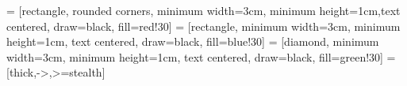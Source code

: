 \usepackage[utf8]{inputenc}
\usepackage[T1]{fontenc}
\usepackage{graphicx}
\usepackage{tikz}
\usepackage{times}
\usepackage{pgfpages}
\usepackage{multicol}
\usepackage{adjustbox}
\usepackage{booktabs}
\usepackage{amssymb}
\usepackage{multirow}
\usepackage{xcolor}
\usepackage{caption}
\usepackage{pdfpages}

\usepackage{tabularx}      %
\usepackage{colortbl}      %
\usepackage{xcolor}        %

\usepackage[none]{hyphenat}

\usepackage{adjustbox}

\usepackage{tikz}
\usetikzlibrary{shapes.geometric, arrows, positioning}

 = [rectangle, rounded corners, minimum width=3cm, minimum height=1cm,text centered, draw=black, fill=red!30]
 = [rectangle, minimum width=3cm, minimum height=1cm, text centered, draw=black, fill=blue!30]
 = [diamond, minimum width=3cm, minimum height=1cm, text centered, draw=black, fill=green!30]
 = [thick,->,>=stealth]
